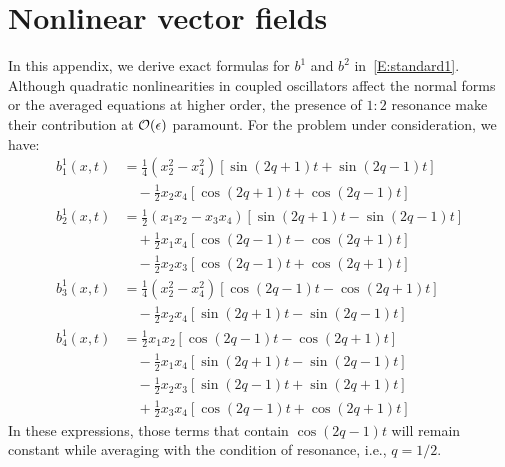 \section{Nonlinear vector fields}
\label{A:autoparam nonlin vec fields}

In this appendix, we derive exact formulas for $b^1$ and $b^2$ in~\eqref{E:standard1}. Although quadratic nonlinearities in coupled oscillators affect the normal forms or the averaged equations at higher order, the presence of $1:2$ resonance make their contribution at ${\mathcal O}(\epsilon)$ paramount. For the problem under consideration, we have:
\begin{align*}
b^1_1(x,t) &= \frac{1}{4} (x_2^2 - x_4^2) [\sin(2q + 1)t + \sin(2q - 1)t]\\
&\quad - \frac12 x_2 x_4 [\cos(2q + 1)t + \cos(2q - 1)t]\\
b^1_2(x,t) &= \frac12 (x_1 x_2 - x_3 x_4) [\sin(2q + 1)t - \sin(2q - 1)t]\\
&\quad + \frac12 x_1 x_4 [\cos (2q - 1)t - \cos(2q + 1)t]\\
&\quad - \frac12 x_2 x_3 [\cos(2q - 1)t + \cos(2q + 1)t]\\
b^1_3(x,t) &= \frac14 (x_2^2 - x_4^2) [\cos(2q - 1)t - \cos(2q + 1)t]\\
&\quad - \frac12 x_2 x_4 [\sin(2q + 1)t - \sin(2q - 1)t]\\
b^1_4(x,t) &= \frac12 x_1 x_2 [\cos(2q - 1)t - \cos(2q + 1)t]\\
&\quad - \frac12 x_1 x_4 [\sin(2q + 1)t - \sin(2q - 1)t]\\
&\quad - \frac12 x_2 x_3 [\sin(2q - 1)t + \sin(2q + 1)t]\\
&\quad + \frac12 x_3 x_4 [\cos(2q - 1)t + \cos(2q + 1)t]
\end{align*}
In these expressions, those terms that contain $\cos(2q - 1)t$ will remain constant while averaging with the condition of resonance, i.e., $q=1/2$.

